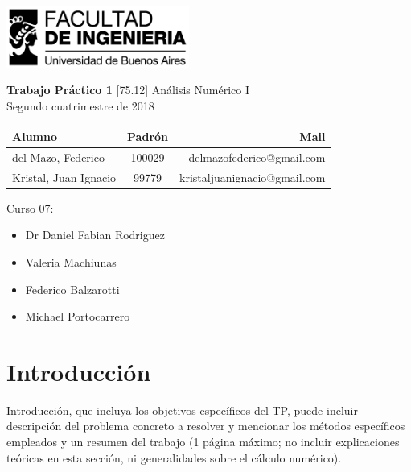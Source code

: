 \documentclass[11pt,a4paper]{article}
\begin{document}
\begin{titlepage}
	\hfill\includegraphics[width=6cm]{figuras/fiuba.jpg}
    \begin{center}
    \vfill
    \Huge \textbf{Trabajo Práctico 1}
    \vskip2cm
    \Large [75.12] Análisis Numérico I\\
    Segundo cuatrimestre de 2018
    \vfill
    \begin{tabular}{|l|c|r|}
	\hline
	Alumno & Padrón & Mail\\
	\hline
	\hline
	del Mazo, Federico & 100029 & delmazofederico@gmail.com\\
	\hline
	Kristal, Juan Ignacio & 99779 & kristaljuanignacio@gmail.com\\
	\hline
	\end{tabular}
    \vskip2cm
    \end{center}

    Curso 07:

    \begin{itemize}
    \item Dr Daniel Fabian Rodriguez
    \item Valeria Machiunas
    \item Federico Balzarotti
    \item Michael Portocarrero
    \end{itemize}

\end{titlepage}



\tableofcontents
\thispagestyle{onlyheader}
\newpage


\setcounter{page}{1}

\section{Introducción}
Introducción, que incluya los objetivos específicos del TP, puede incluir descripción del
problema concreto a resolver y mencionar los métodos específicos empleados y un resumen del
trabajo (1 página máximo; no incluir explicaciones teóricas en esta sección, ni generalidades
sobre el cálculo numérico).
\end{document}
